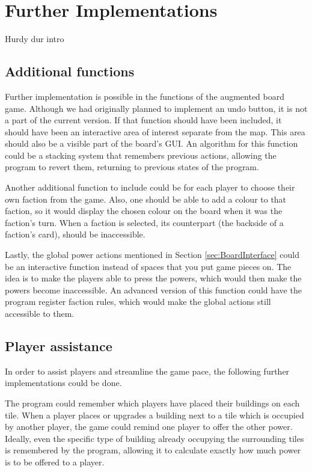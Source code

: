 \chapter{Further Implementations}\label{ch:furthimp}
Hurdy dur intro

\section{Additional functions}
Further implementation is possible in the functions of the augmented board game. Although we had originally planned to implement an undo button, it is not a part of the current version. If that function should have been included, it should have been an interactive area of interest separate from the map. This area should also be a visible part of the board’s GUI. An algorithm for this function could be a stacking system that remembers previous actions, allowing the program to revert them, returning to previous states of the program.

Another additional function to include could be for each player to choose their own faction from the game. Also, one should be able to add a colour to that faction, so it would display the chosen colour on the board when it was the faction’s turn. When a faction is selected, its counterpart (the backside of a faction’s card), should be inaccessible.

Lastly, the global power actions mentioned in Section \ref{sec:BoardInterface} could be an interactive function instead of spaces that you put game pieces on. The idea is to make the players able to press the powers, which would then make the powers become inaccessible. An advanced version of this function could have the program register faction rules, which would make the global actions still accessible to them. 

\section{Player assistance}
In order to assist players and streamline the game pace, the following further implementations could be done.

The program could remember which players have placed their buildings on each tile. When a player places or upgrades a building next to a tile which is occupied by another player, the game could remind one player to offer the other power. Ideally, even the specific type of building already occupying the surrounding tiles is remembered by the program, allowing it to calculate exactly how much power is to be offered to a player.

